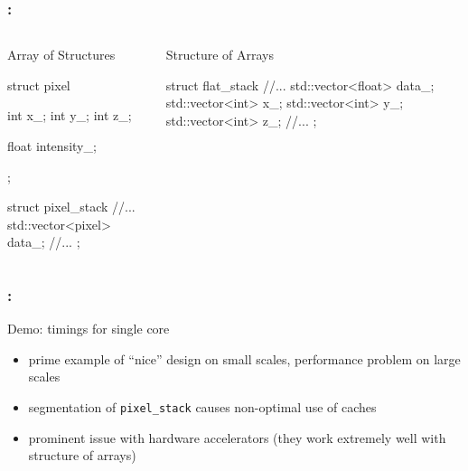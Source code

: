 \documentclass[9pt,xcolor=table]{beamer}
\begin{document}
\begin{frame}[fragile]
  \frametitle{\insertsectionhead{}: \insertsubsectionhead{}}
  \begin{columns}[t]
    \begin{column}{.45\textwidth}
      \begin{block}{Array of Structures}
        \begin{pyglist}[language=c++,numbers=left,style=emacs]
        struct pixel {
      
        int x_;
        int y_;
        int z_;
      
        float intensity_;
      
      };
      
        struct pixel_stack {
        //...
        std::vector<pixel> data_;
        //...
      };
      \end{pyglist}
      \vfill
      \end{block}
    \end{column}
    \pause
    \begin{column}{.45\textwidth}
      \begin{block}{Structure of Arrays}
        \begin{pyglist}[language=c++,numbers=left,style=emacs]
      
        struct flat_stack   {
        //...
        std::vector<float> data_;
        std::vector<int> x_;
        std::vector<int> y_;
        std::vector<int> z_;
        //...
      };
      \end{pyglist}
      \vfill
      \end{block}
    \end{column}
  \end{columns}
\end{frame}

\begin{frame}
\frametitle{\insertsectionhead{}: \insertsubsectionhead{}}
\begin{center}
  \huge \alert{Demo: timings for single core}
\end{center}
\pause
\begin{itemize}
\item prime example of ``nice'' design on small scales, performance problem on large scales
\item segmentation of \texttt{pixel\_stack} causes non-optimal use of caches
\item prominent issue with hardware accelerators (they work extremely well with structure of arrays)
\end{itemize}
\end{frame}
\end{document}
